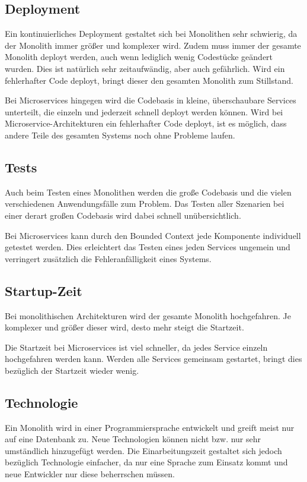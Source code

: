 \subsection{Deployment}
Ein kontinuierliches Deployment gestaltet sich bei Monolithen sehr schwierig, da der Monolith immer größer und komplexer wird. Zudem muss immer der gesamte Monolith deployt werden, auch wenn lediglich wenig Codestücke geändert wurden. Dies ist natürlich sehr zeitaufwändig, aber auch gefährlich. Wird ein fehlerhafter Code deployt, bringt dieser den gesamten Monolith zum Stillstand.

Bei Microservices hingegen wird die Codebasis in kleine, überschaubare Services unterteilt, die einzeln und jederzeit schnell deployt werden können. Wird bei Microservice-Architekturen ein fehlerhafter Code deployt, ist es möglich, dass andere Teile des gesamten Systems noch ohne Probleme laufen.

\subsection{Tests}
Auch beim Testen eines Monolithen werden die große Codebasis und die vielen verschiedenen Anwendungsfälle zum Problem. Das Testen aller Szenarien bei einer derart großen Codebasis wird dabei schnell unübersichtlich.

Bei Microservices kann durch den Bounded Context jede Komponente individuell getestet werden. Dies erleichtert das Testen eines jeden Services ungemein und verringert zusätzlich die Fehleranfälligkeit eines Systems.

\subsection{Startup-Zeit}
Bei monolithischen Architekturen wird der gesamte Monolith hochgefahren. Je komplexer und größer dieser wird, desto mehr steigt die Startzeit.

Die Startzeit bei Microservices ist viel schneller, da jedes Service einzeln hochgefahren werden kann. Werden alle Services gemeinsam gestartet, bringt dies bezüglich der Startzeit wieder wenig.

\subsection{Technologie}
Ein Monolith wird in einer Programmiersprache entwickelt und greift meist nur auf eine Datenbank zu. Neue Technologien können nicht bzw. nur sehr umständlich hinzugefügt werden. Die Einarbeitungszeit gestaltet sich jedoch bezüglich Technologie einfacher, da nur eine Sprache zum Einsatz kommt und neue Entwickler nur diese beherrschen müssen.

